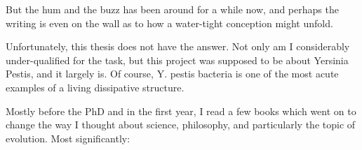 But the hum and the buzz has been around for a while now,  and perhaps the writing is even on the wall as to how a water-tight conception might unfold.

Unfortunately,  this thesis does not have the answer.  Not only am I considerably under-qualified for the task,  but this project was supposed to be about Yersinia Pestis,  and it largely is.  Of course,  Y.  pestis bacteria is one of the most acute examples of a living dissipative structure.  \par

\vspace{10pt} 



\noindent
 Mostly before the PhD and in the first year,  I read a few books which went on to change the way I thought about science,  philosophy,  and particularly the topic of evolution.  Most significantly: 



